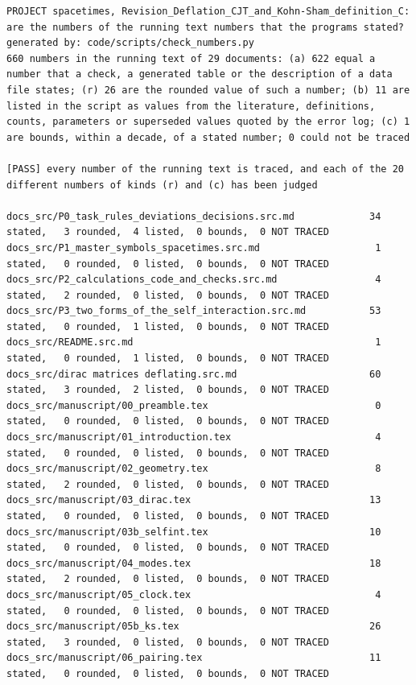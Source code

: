 \documentclass[
  10pt,
]{article}
\begin{document}
\begin{verbatim}
PROJECT spacetimes, Revision_Deflation_CJT_and_Kohn-Sham_definition_C: are the numbers of the running text numbers that the programs stated?
generated by: code/scripts/check_numbers.py
660 numbers in the running text of 29 documents: (a) 622 equal a number that a check, a generated table or the description of a data file states; (r) 26 are the rounded value of such a number; (b) 11 are listed in the script as values from the literature, definitions, counts, parameters or superseded values quoted by the error log; (c) 1 are bounds, within a decade, of a stated number; 0 could not be traced

[PASS] every number of the running text is traced, and each of the 20 different numbers of kinds (r) and (c) has been judged

docs_src/P0_task_rules_deviations_decisions.src.md             34 stated,   3 rounded,  4 listed,  0 bounds,  0 NOT TRACED
docs_src/P1_master_symbols_spacetimes.src.md                    1 stated,   0 rounded,  0 listed,  0 bounds,  0 NOT TRACED
docs_src/P2_calculations_code_and_checks.src.md                 4 stated,   2 rounded,  0 listed,  0 bounds,  0 NOT TRACED
docs_src/P3_two_forms_of_the_self_interaction.src.md           53 stated,   0 rounded,  1 listed,  0 bounds,  0 NOT TRACED
docs_src/README.src.md                                          1 stated,   0 rounded,  1 listed,  0 bounds,  0 NOT TRACED
docs_src/dirac matrices deflating.src.md                       60 stated,   3 rounded,  2 listed,  0 bounds,  0 NOT TRACED
docs_src/manuscript/00_preamble.tex                             0 stated,   0 rounded,  0 listed,  0 bounds,  0 NOT TRACED
docs_src/manuscript/01_introduction.tex                         4 stated,   0 rounded,  0 listed,  0 bounds,  0 NOT TRACED
docs_src/manuscript/02_geometry.tex                             8 stated,   2 rounded,  0 listed,  0 bounds,  0 NOT TRACED
docs_src/manuscript/03_dirac.tex                               13 stated,   0 rounded,  0 listed,  0 bounds,  0 NOT TRACED
docs_src/manuscript/03b_selfint.tex                            10 stated,   0 rounded,  0 listed,  0 bounds,  0 NOT TRACED
docs_src/manuscript/04_modes.tex                               18 stated,   2 rounded,  0 listed,  0 bounds,  0 NOT TRACED
docs_src/manuscript/05_clock.tex                                4 stated,   0 rounded,  0 listed,  0 bounds,  0 NOT TRACED
docs_src/manuscript/05b_ks.tex                                 26 stated,   3 rounded,  0 listed,  0 bounds,  0 NOT TRACED
docs_src/manuscript/06_pairing.tex                             11 stated,   0 rounded,  0 listed,  0 bounds,  0 NOT TRACED

\end{verbatim}
\end{document}
